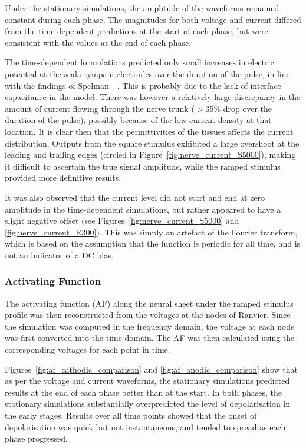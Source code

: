 Under the stationary simulations, the amplitude of the waveforms remained
constant during each phase. The magnitudes for both voltage and current differed
from the time-dependent predictions at the start of each phase, but were
consistent with the values at the end of each phase.

The time-dependent formulations predicted only small increases in electric
potential at the scala tympani electrodes over the duration of the pulse, in
line with the findings of Spelman~\etal~\cite{spelman1982}. This is probably due
to the lack of interface capacitance in the model. There was however a
relatively large discrepancy in the amount of current flowing through the nerve
trunk ($ > $35\% drop over the duration of the pulse), possibly because of the
low current density at that location. It is clear then that the permittivities
of the tissues affects the current distribution. Outputs from the square
stimulus exhibited a large overshoot at the leading and trailing edges (circled
in Figure~\ref{fig:nerve_current_S5000}), making it difficult to ascertain the
true signal amplitude, while the ramped stimulus provided more definitive
results.

It was also observed that the current level did not start and end at zero
amplitude in the time-dependent simulations, but rather appeared to have a
slight negative offset (see Figures~\ref{fig:nerve_current_S5000} and
\ref{fig:nerve_current_R300}). This was simply an artefact of the Fourier
transform, which is based on the assumption that the function is periodic for
all time, and is not an indicator of a DC bias.

\subsubsection{Activating Function}

The activating function (AF) along the neural sheet under the ramped stimulus
profile was then reconstructed from the voltages at the nodes of Ranvier. Since
the simulation was computed in the frequency domain, the voltage at each node
was first converted into the time domain. The AF was then calculated using the
corresponding voltages for each point in time.

Figures~\ref{fig:af_cathodic_comparison} and \ref{fig:af_anodic_comparison} show
that as per the voltage and current waveforms, the stationary simulations
predicted results at the end of each phase better than at the start. In both
phases, the stationary simulations substantially overpredicted the level of
depolarisation in the early stages. Results over all time points showed that the
onset of depolarisation was quick but not instantaneous, and tended to spread as
each phase progressed.

